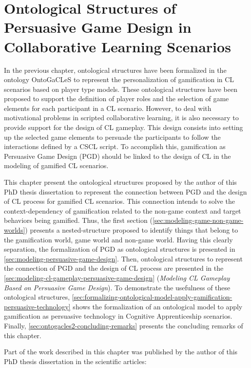 \chapter[Ontological Structures of Persuasive Game Design in CL Scenarios]{Ontological Structures of Persuasive Game Design in Collaborative Learning Scenarios}
\label{chapter:ontogacles-2}

In the previous chapter, ontological structures have been formalized in the ontology OntoGaCLeS to represent the personalization of gamification in CL scenarios based on player type models. These ontological structures have been proposed to support the definition of player roles and the selection of game elements for each participant in a CL scenario.
However, to deal with motivational problems in scripted collaborative learning, it is also necessary to provide support for the design of CL gameplay.
This design consists into setting up the selected game elements to persuade the participants to follow the interactions defined by a CSCL script.
To accomplish this, gamification as Persuasive Game Design (PGD) should be linked to the design of CL in the modeling of gamified CL scenarios.

This chapter present the ontological structures proposed by the author of this PhD thesis dissertation to represent the connection between PGD and the design of CL process for gamified CL scenarios.
This connection intends to solve the context-dependency of gamification related to the non-game context and target behaviors being gamified.
Thus, the first section (\autoref{sec:modeling-game-non-game-worlds}) presents a nested-structure proposed to identify things that belong to the gamification world, game world and non-game world. Having this clearly separation, the formalization of PGD as ontological structures is presented in \autoref{sec:modeling-persuasive-game-design}.
Then, ontological structures to represent the connection of PGD and the design of CL process are presented in the \autoref{sec:modeling-cl-gameplay-persuasive-game-design} (\emph{Modeling CL Gameplay Based on Persuasive Game Design}).
To demonstrate the usefulness of these ontological structures, \autoref{sec:formalizing-ontological-model-apply-gamification-persuasive-technology} shows the formalization of an ontological model to apply gamification as persuasive technology in Cognitive Apprenticeship scenarios.
Finally, \autoref{sec:ontogacles2-concluding-remarks} presents the concluding remarks of this chapter.
 
Part of the work described in this chapter was published by the author of this PhD thesis dissertation in the scientific articles:

